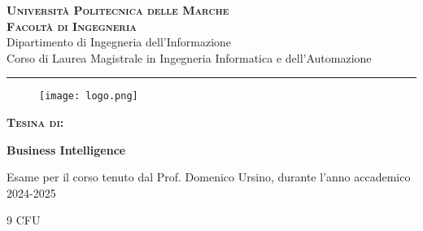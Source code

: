 \documentclass[11pt,fleqn, openany]{book} %
\begin{document}
\begin{center}
{\LARGE \bf \scshape Universit\`a Politecnica delle Marche}\\
\vspace{0.2cm}
{\Large \bf \scshape Facolt\`a di Ingegneria}\\
\vspace{0.2cm}
{\Large Dipartimento di Ingegneria dell'Informazione}\\
\vspace{0.2cm}
{\large Corso di Laurea Magistrale in Ingegneria Informatica e dell'Automazione}\\

\rule{150mm}{.2mm}


\vspace{5mm}

\begin{figure}[h!]
	\centering
	\texttt{[image: logo.png]}
\end{figure}

\vspace{5mm}

\textbf{\color{black} \large \scshape Tesina di:}

\vspace{2mm}

\color{Green}\LARGE{\bf Business Intelligence}\color{black}
\vspace{4mm}

\large{Esame per il corso tenuto dal Prof. Domenico Ursino, durante l'anno accademico 2024-2025}

\vspace{4mm}

\large{9 CFU}

\vfill

\end{center} 	
\vspace{20mm} 	
\end{document}
